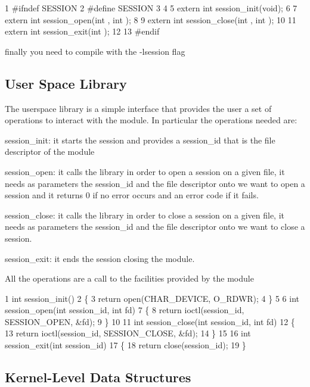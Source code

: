 \begin{DoxyCode}
1 #ifndef SESSION
2 #define SESSION
3 
4 
5 extern int session\_init(void);
6 
7 extern int session\_open(int , int );
8 
9 extern int session\_close(int , int );
10 
11 extern int session\_exit(int );
12 
13 #endif
\end{DoxyCode}
 finally you need to compile with the -\/lsession flag

\subsection*{User Space Library}

The userspace library is a simple interface that provides the user a set of operations to interact with the module. In particular the operations needed are\+:
\begin{DoxyItemize}
\item session\+\_\+init\+: it starts the session and provides a session\+\_\+id that is the file descriptor of the module
\item session\+\_\+open\+: it calls the library in order to open a session on a given file, it needs as parameters the session\+\_\+id and the file descriptor onto we want to open a session and it returns 0 if no error occurs and an error code if it fails.
\item session\+\_\+close\+: it calls the library in order to close a session on a given file, it needs as parameters the session\+\_\+id and the file descriptor onto we want to close a session.
\item session\+\_\+exit\+: it ends the session closing the module.
\end{DoxyItemize}

All the operations are a call to the facilities provided by the module 
\begin{DoxyCode}
1 int session\_init()
2 \{
3     return open(CHAR\_DEVICE, O\_RDWR);
4 \}
5 
6 int session\_open(int session\_id, int fd)
7 \{  
8     return ioctl(session\_id, SESSION\_OPEN, &fd);  
9 \}
10 
11 int session\_close(int session\_id, int fd)
12 \{   
13     return ioctl(session\_id, SESSION\_CLOSE, &fd); 
14 \}
15 
16 int session\_exit(int session\_id)
17 \{   
18         return close(session\_id);
19 \}
\end{DoxyCode}


\subsection*{Kernel-\/\+Level Data Structures}

